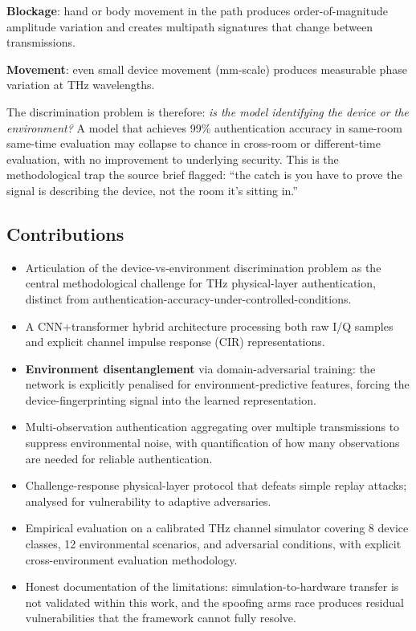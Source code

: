 \documentclass[sigconf,nonacm]{acmart}
\begin{document}
\textbf{Blockage}: hand or body movement in the path produces
order-of-magnitude amplitude variation and creates multipath
signatures that change between transmissions.

\textbf{Movement}: even small device movement (mm-scale) produces
measurable phase variation at THz wavelengths.

The discrimination problem is therefore: \emph{is the model
identifying the device or the environment?} A model that achieves
99\% authentication accuracy in same-room same-time evaluation may
collapse to chance in cross-room or different-time evaluation, with
no improvement to underlying security. This is the methodological
trap the source brief flagged: ``the catch is you have to prove the
signal is describing the device, not the room it's sitting in.''

\subsection{Contributions}

\begin{itemize}
  \item Articulation of the device-vs-environment discrimination
        problem as the central methodological challenge for THz
        physical-layer authentication, distinct from
        authentication-accuracy-under-controlled-conditions.
  \item A CNN+transformer hybrid architecture processing both raw
        I/Q samples and explicit channel impulse response (CIR)
        representations.
  \item \textbf{Environment disentanglement} via domain-adversarial
        training: the network is explicitly penalised for
        environment-predictive features, forcing the
        device-fingerprinting signal into the learned representation.
  \item Multi-observation authentication aggregating over multiple
        transmissions to suppress environmental noise, with
        quantification of how many observations are needed for
        reliable authentication.
  \item Challenge-response physical-layer protocol that defeats
        simple replay attacks; analysed for vulnerability to
        adaptive adversaries.
  \item Empirical evaluation on a calibrated THz channel simulator
        covering 8 device classes, 12 environmental scenarios, and
        adversarial conditions, with explicit cross-environment
        evaluation methodology.
  \item Honest documentation of the limitations: simulation-to-hardware
        transfer is not validated within this work, and the
        spoofing arms race produces residual vulnerabilities that
        the framework cannot fully resolve.
\end{itemize}
\end{document}

